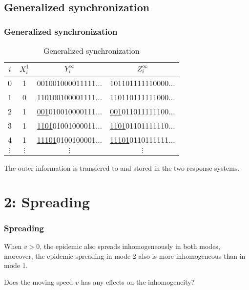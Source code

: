 \documentclass[14pt,handout]{beamer}
\begin{document}
\subsection{Generalized synchronization}
\begin{frame} \frametitle{Generalized synchronization}
\begin{table}[htop]
\centering
\caption[GSync-Table]{Generalized synchronization} \label{tab:gsync}
\begin{tabular}{c|c|c|c}
\hline
$i$ & $X_i^1$ & $Y_i^\infty$ & $Z_i^\infty$ \\
\hline
0 & 1 &             001001000011111$\ldots$ &             101101111110000$\ldots$ \\
1 & 0 & \underline{11}0100100001111$\ldots$ & \underline{11}0110111111000$\ldots$ \\
2 & 1 & \underline{001}010010000111$\ldots$ & \underline{001}011011111100$\ldots$ \\
3 & 1 & \underline{1101}01001000011$\ldots$ & \underline{1101}01101111110$\ldots$ \\
4 & 1 & \underline{11101}0100100001$\ldots$ & \underline{11101}0110111111$\ldots$ \\
$\vdots$ & $\vdots$ & $\vdots$ & $\vdots$\\
\hline\end{tabular}\end{table}
\begin{block}{}
The outer information is transfered to and stored in the two response systems.
\end{block}
\end{frame}

\section{2: Spreading}
\begin{frame} \frametitle{Spreading}
When $v>0$, the epidemic also spreads inhomogeneously in both modes, moreover, the epidemic spreading in mode 2 also is more inhomogeneous than in mode 1.
\begin{block}{}
Does the moving speed $v$ has any effects on the inhomogeneity?
\end{block}
\end{frame}
\end{document}
